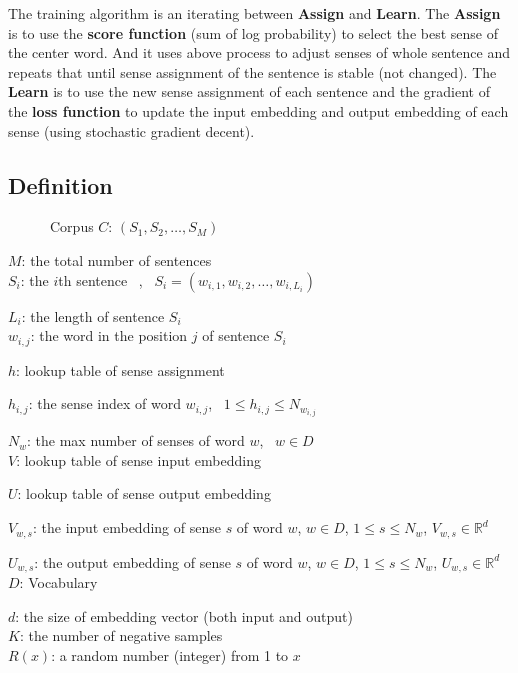 \documentclass[12pt,a4paper,twoside]{book}
\begin{document}
The training algorithm is an iterating between \textbf{Assign} and \textbf{Learn}. The \textbf{Assign} is to use the \textbf{score function} (sum of log probability) to select the best sense of the center word. And it uses above process to adjust senses of whole sentence and repeats that until sense assignment of the sentence is stable (not changed). The \textbf{Learn} is to use the new sense assignment of each sentence and the gradient of the \textbf{loss function} to update the input embedding and output embedding of each sense (using stochastic gradient decent). 
\subsection{Definition}

\ \ \ \ \ \ Corpus $C$: $(S_1,S_2,\ldots,S_M)$

$M$: the total number of sentences\\

$S_i$: the $i$th sentence \ , \ $S_i = (w_{i,1},w_{i,2},\ldots,w_{i,L_i})$

$L_i$: the length of sentence $S_i$\\

$w_{i,j}$: the word in the position $j$ of sentence $S_i$

$h$: lookup table of sense assignment

$h_{i,j}$: the sense index of word $w_{i,j}$, \ $1\leq h_{i,j}\leq N_{w_{i,j}}$

$N_w$: the max number of senses of word $w$, \ $w\in D$\\

$V$: lookup table of sense input embedding 

$U$: lookup table of  sense output embedding 

$V_{w,s}$: the input embedding of sense $s$ of word $w$, $w\in D$, $1\leq s\leq N_w$, $V_{w,s} \in \mathbb{R}^d$

$U_{w,s}$: the output embedding of sense $s$ of word $w$, $w\in D$, $1\leq s\leq N_w$, $U_{w,s} \in \mathbb{R}^d$\\

$D$: Vocabulary 

$d$: the size of embedding vector (both input and output)\\

$K$: the number of negative samples\\

$R(x)$: a random number (integer) from 1 to $x$
\end{document}
